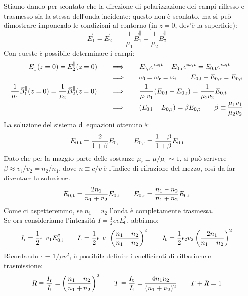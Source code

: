 \documentclass[]{article}
\begin{document}
Stiamo dando per scontato che la direzione di polarizzazione dei campi riflesso e trasmesso sia la stessa dell'onda incidente: questo non è scontato, ma si può dimostrare imponendo le condizioni al contorno (in $ z = 0 $, dov'è la superficie):
\begin{equation}
	\vec{E}_1^{\parallel} = \vec{E}_2^{\parallel} \qquad \frac{1}{\mu_1}\vec{B}_1^{\parallel} = \frac{1}{\mu_2}\vec{B}_2^{\parallel}
	\label{eq:53}
\end{equation}
Con queste è possibile determinare i campi:
\begin{align}
	\begin{split}
		E_1^{\parallel}(z=0) = E_2^{\parallel}(z=0) &\qquad\Longrightarrow\qquad E_{0,\text{i}} e^{i\omega_{\text{i}} t} + E_{0,\text{r}} e^{i\omega_{\text{r}} t} = E_{0,\text{t}} e^{i\omega_{\text{t}} t} \\ 
							    &\qquad\Longrightarrow\qquad \omega_{\text{i}} = \omega_{\text{r}} = \omega_{\text{t}} \qquad E_{0,\text{i}} + E_{0,\text{r}} = E_{0,\text{t}}
	\end{split}
	\\ 
	\begin{split}
		\frac{1}{\mu_1}\vec{B}_1^{\parallel}(z=0) = \frac{1}{\mu_2}\vec{B}_2^{\parallel}(z=0) &\qquad\Longrightarrow\qquad \frac{1}{\mu_1 v_1} (E_{0,\text{i}} - E_{0,\text{r}}) = \frac{1}{\mu_2 v_2} E_{0,\text{t}} \\ 
												      &\qquad\Longrightarrow\qquad (E_{0,\text{i}} - E_{0, \text{r}}) = \beta E_{0,\text{t}} \qquad \beta \equiv \frac{\mu_1 v_1}{\mu_2 v_2}
	\end{split}
	\label{eq:54-55}
\end{align}
La soluzione del sistema di equazioni ottenuto è:
\begin{equation}
	E_{0,\text{t}} = \frac{2}{1 + \beta} E_{0,\text{i}} \qquad E_{0,\text{r}} = \frac{1 - \beta}{1 + \beta} E_{0,\text{i}}
	\label{eq:56}
\end{equation}
Dato che per la maggio parte delle sostanze $ \mu_r \equiv \mu / \mu_0 \sim 1 $, si può scrivere $ \beta \approx v_1 / v_2 = n_2 / n_1 $, dove $ n \equiv c / v $ è l'indice di rifrazione del mezzo, così da far diventare la soluzione:
\begin{equation}
	E_{0,\text{t}} = \frac{2n_1}{n_1 + n_2} E_{0,\text{i}} \qquad E_{0,\text{r}} = \frac{n_1 - n_2}{n_1 + n_2} E_{0,\text{i}}
	\label{eq:57}
\end{equation}
Come ci aspetteremmo, se $ n_1 = n_2 $ l'onda è completamente trasmessa. \\ 
%
Se ora consideriamo l'intensità $ I = \frac{1}{2} \epsilon v E_0^2 $, abbiamo:
\begin{equation}
	I_{\text{i}} = \frac{1}{2} \epsilon_1 v_1 E_{0,\text{i}}^2 \qquad I_{\text{r}} = \frac{1}{2} \epsilon_1 v_1 \left( \frac{n_1 - n_2}{n_1 + n_2}\right)^2 \qquad I_{\text{t}} = \frac{1}{2} \epsilon_2 v_2 \left( \frac{2n_1}{n_1 + n_2} \right)^2
	\label{eq:58}
\end{equation}
Ricordando $ \epsilon = 1 / \mu v^2 $, è possibile definire i coefficienti di riflessione e trasmissione:
\begin{equation}
	R \equiv \frac{I_{\text{r}}}{I_{\text{i}}} = \left( \frac{n_1 - n_2}{n_1 + n_2} \right)^2 \qquad T \equiv \frac{I_{\text{t}}}{I_{\text{i}}} = \frac{4 n_1 n_2}{(n_1 + n_2)^2} \qquad T + R = 1
	\label{eq:59}
\end{equation}
\end{document}

